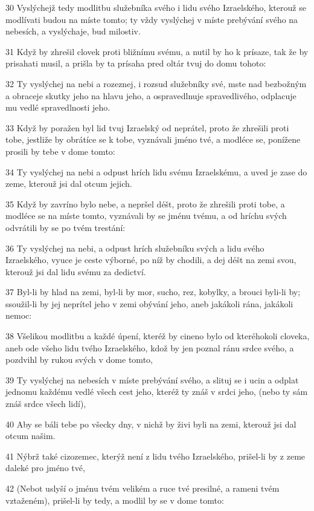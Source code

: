 \par 30 Vyslýchejž tedy modlitbu služebníka svého i lidu svého Izraelského, kterouž se modlívati budou na míste tomto; ty vždy vyslýchej v míste prebývání svého na nebesích, a vyslýchaje, bud milostiv.
\par 31 Když by zhrešil clovek proti bližnímu svému, a nutil by ho k prísaze, tak že by prisahati musil, a prišla by ta prísaha pred oltár tvuj do domu tohoto:
\par 32 Ty vyslýchej na nebi a rozeznej, i rozsud služebníky své, mste nad bezbožným a obraceje skutky jeho na hlavu jeho, a ospravedlnuje spravedlivého, odplacuje mu vedlé spravedlnosti jeho.
\par 33 Když by poražen byl lid tvuj Izraelský od neprátel, proto že zhrešili proti tobe, jestliže by obrátíce se k tobe, vyznávali jméno tvé, a modléce se, ponížene prosili by tebe v dome tomto:
\par 34 Ty vyslýchej na nebi a odpust hrích lidu svému Izraelskému, a uved je zase do zeme, kterouž jsi dal otcum jejich.
\par 35 Když by zavríno bylo nebe, a nepršel déšt, proto že zhrešili proti tobe, a modléce se na míste tomto, vyznávali by se jménu tvému, a od hríchu svých odvrátili by se po tvém trestání:
\par 36 Ty vyslýchej na nebi, a odpust hrích služebníku svých a lidu svého Izraelského, vyuce je ceste výborné, po níž by chodili, a dej déšt na zemi svou, kterouž jsi dal lidu svému za dedictví.
\par 37 Byl-li by hlad na zemi, byl-li by mor, sucho, rez, kobylky, a brouci byli-li by; ssoužil-li by jej neprítel jeho v zemi obývání jeho, aneb jakákoli rána, jakákoli nemoc:
\par 38 Všelikou modlitbu a každé úpení, kteréž by cineno bylo od kteréhokoli cloveka, aneb ode všeho lidu tvého Izraelského, kdož by jen poznal ránu srdce svého, a pozdvihl by rukou svých v dome tomto,
\par 39 Ty vyslýchej na nebesích v míste prebývání svého, a slituj se i ucin a odplat jednomu každému vedlé všech cest jeho, kteréž ty znáš v srdci jeho, (nebo ty sám znáš srdce všech lidí),
\par 40 Aby se báli tebe po všecky dny, v nichž by živi byli na zemi, kterouž jsi dal otcum našim.
\par 41 Nýbrž také cizozemec, kterýž není z lidu tvého Izraelského, prišel-li by z zeme daleké pro jméno tvé,
\par 42 (Nebot uslyší o jménu tvém velikém a ruce tvé presilné, a rameni tvém vztaženém), prišel-li by tedy, a modlil by se v dome tomto:
